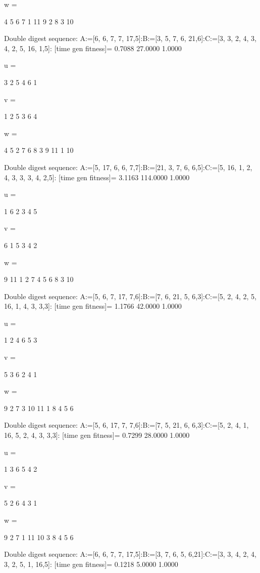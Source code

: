 w =

     4     5     6     7     1    11     9     2     8     3    10

Double digest sequence:
A:=[6, 6, 7, 7, 17,5]:B:=[3, 5, 7, 6, 21,6]:C:=[3, 3, 2, 4, 3, 4, 2, 5, 16, 1,5]:
[time gen fitness]=
    0.7088   27.0000    1.0000


u =

     3     2     5     4     6     1


v =

     1     2     5     3     6     4


w =

     4     5     2     7     6     8     3     9    11     1    10

Double digest sequence:
A:=[5, 17, 6, 6, 7,7]:B:=[21, 3, 7, 6, 6,5]:C:=[5, 16, 1, 2, 4, 3, 3, 3, 4, 2,5]:
[time gen fitness]=
    3.1163  114.0000    1.0000


u =

     1     6     2     3     4     5


v =

     6     1     5     3     4     2


w =

     9    11     1     2     7     4     5     6     8     3    10

Double digest sequence:
A:=[5, 6, 7, 17, 7,6]:B:=[7, 6, 21, 5, 6,3]:C:=[5, 2, 4, 2, 5, 16, 1, 4, 3, 3,3]:
[time gen fitness]=
    1.1766   42.0000    1.0000


u =

     1     2     4     6     5     3


v =

     5     3     6     2     4     1


w =

     9     2     7     3    10    11     1     8     4     5     6

Double digest sequence:
A:=[5, 6, 17, 7, 7,6]:B:=[7, 5, 21, 6, 6,3]:C:=[5, 2, 4, 1, 16, 5, 2, 4, 3, 3,3]:
[time gen fitness]=
    0.7299   28.0000    1.0000


u =

     1     3     6     5     4     2


v =

     5     2     6     4     3     1


w =

     9     2     7     1    11    10     3     8     4     5     6

Double digest sequence:
A:=[6, 6, 7, 7, 17,5]:B:=[3, 7, 6, 5, 6,21]:C:=[3, 3, 4, 2, 4, 3, 2, 5, 1, 16,5]:
[time gen fitness]=
    0.1218    5.0000    1.0000


